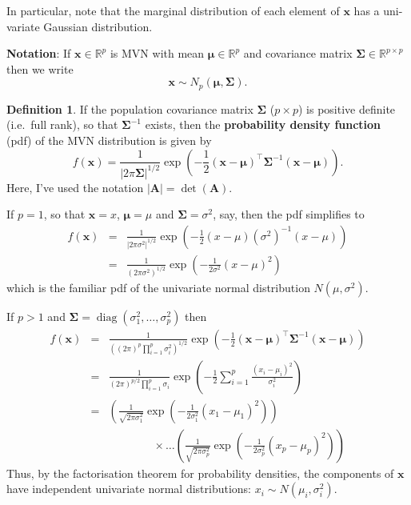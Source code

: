 \documentclass[
]{book}
\theoremstyle{definition}
\newtheorem{definition}{Definition}[chapter]
\theoremstyle{definition}
\theoremstyle{definition}
\theoremstyle{definition}
\theoremstyle{remark}
\begin{document}
In particular, note that the marginal distribution of each element of \(\mathbf x\) has a uni-variate Gaussian distribution.

\textbf{Notation}: \quad If \(\mathbf x\in \mathbb{R}^p\) is MVN with mean \({\boldsymbol{\mu}}\in \mathbb{R}^p\) and covariance matrix \(\boldsymbol{\Sigma}\in \mathbb{R}^{p\times p}\) then we write
\[ \mathbf x\sim N_p ({\boldsymbol{\mu}}, \boldsymbol{\Sigma}).\]

\begin{definition}
\protect\hypertarget{def:mvnpdf}{}\label{def:mvnpdf}If the population covariance matrix \(\boldsymbol{\Sigma}\) (\(p \times p\)) is positive definite (i.e.~full rank), so that \(\boldsymbol{\Sigma}^{-1}\) exists,
then the \textbf{probability density function} (pdf) of the MVN distribution is given by
\[ f(\mathbf x) = \frac{1}{| 2 \pi \boldsymbol{\Sigma}|^{1/2}} \exp \left(-\frac{1}{2}(\mathbf x- {\boldsymbol{\mu}})^\top \boldsymbol{\Sigma}^{-1} (\mathbf x- {\boldsymbol{\mu}}) \right).\]
Here, I've used the notation \(|\mathbf A| = \det(\mathbf A)\).
\end{definition}

If \(p=1\), so that \(\mathbf x= x\), \({\boldsymbol{\mu}}= \mu\) and \(\boldsymbol{\Sigma}= \sigma^2\), say, then the pdf simplifies to
\begin{eqnarray*}
f(\mathbf x) &=& \frac{1}{|2 \pi \sigma^2|^{1/2}} \exp \left(-\frac{1}{2}(x - \mu) (\sigma^2)^{-1} (x - \mu) \right)\\
&=& \frac{1}{(2 \pi \sigma^2)^{1/2}} \exp \left(-\frac{1}{2 \sigma^2}(x - \mu)^2 \right)
\end{eqnarray*}
which is the familiar pdf of the univariate normal distribution \(N(\mu,\sigma^2)\).

If \(p>1\) and \(\boldsymbol{\Sigma}= \operatorname{diag}(\sigma_1^2, \ldots, \sigma_p^2)\) then
\begin{eqnarray*}
f(\mathbf x) &=& \frac{1}{((2 \pi)^{p}\prod_{i=1}^p \sigma_i^2)^{1/2}} \exp \left(-\frac{1}{2}(\mathbf x- {\boldsymbol{\mu}})^\top \boldsymbol{\Sigma}^{-1}(\mathbf x- {\boldsymbol{\mu}}) \right)\\
&=& \frac{1}{(2 \pi)^{p/2}\prod_{i=1}^p \sigma_i} \exp \left(-\frac{1}{2} \sum_{i=1}^p \frac{(x_i - \mu_i)^2}{\sigma_i^2} \right)\\
&=& \left(\frac{1}{\sqrt{2 \pi\sigma_1^2}} \exp \left(-\frac{1}{2\sigma_1^2} (x_1 - \mu_1)^2 \right)\right)\\
 && \qquad \qquad \times \ldots \left(\frac{1}{\sqrt{2 \pi \sigma_p^2}} \exp \left(-\frac{1}{2\sigma_p^2} (x_p - \mu_p)^2 \right)\right)
\end{eqnarray*}
Thus, by the factorisation theorem for probability densities, the components of \(\mathbf x\) have independent univariate normal distributions: \(x_i \sim N(\mu_i, \sigma_i^2)\).
\end{document}
